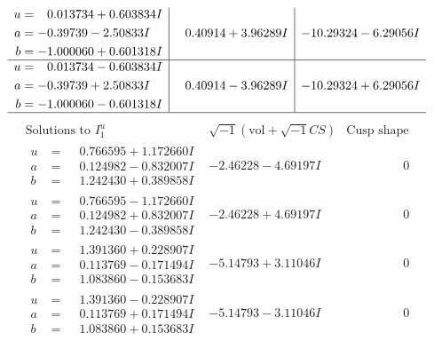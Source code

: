 \documentclass[1p]{elsarticle_modified}
\theoremstyle{definition}
\newcommand{\I}{\sqrt{-1}}
\begin{document}
$$\begin{array}{c|c|c}
\begin{aligned}
u &= \phantom{-}0.013734 + 0.603834 I \\
a &= -0.39739 - 2.50833 I \\
b &= -1.000060 + 0.601318 I\end{aligned}
 & \phantom{-}0.40914 + 3.96289 I & -10.29324 - 6.29056 I \\ \hline\begin{aligned}
u &= \phantom{-}0.013734 - 0.603834 I \\
a &= -0.39739 + 2.50833 I \\
b &= -1.000060 - 0.601318 I\end{aligned}
 & \phantom{-}0.40914 - 3.96289 I & -10.29324 + 6.29056 I\\
 \hline 
 \end{array}$$\newpage$$\begin{array}{c|c|c}  
\text{Solutions to }I^u_{1}& \I (\text{vol} + \sqrt{-1}CS) & \text{Cusp shape}\\
 \hline 
\begin{aligned}
u &= \phantom{-}0.766595 + 1.172660 I \\
a &= \phantom{-}0.124982 - 0.832007 I \\
b &= \phantom{-}1.242430 + 0.389858 I\end{aligned}
 & -2.46228 - 4.69197 I & \phantom{-0.000000 } 0 \\ \hline\begin{aligned}
u &= \phantom{-}0.766595 - 1.172660 I \\
a &= \phantom{-}0.124982 + 0.832007 I \\
b &= \phantom{-}1.242430 - 0.389858 I\end{aligned}
 & -2.46228 + 4.69197 I & \phantom{-0.000000 } 0 \\ \hline\begin{aligned}
u &= \phantom{-}1.391360 + 0.228907 I \\
a &= \phantom{-}0.113769 - 0.171494 I \\
b &= \phantom{-}1.083860 - 0.153683 I\end{aligned}
 & -5.14793 + 3.11046 I & \phantom{-0.000000 } 0 \\ \hline\begin{aligned}
u &= \phantom{-}1.391360 - 0.228907 I \\
a &= \phantom{-}0.113769 + 0.171494 I \\
b &= \phantom{-}1.083860 + 0.153683 I\end{aligned}
 & -5.14793 - 3.11046 I & \phantom{-0.000000 } 0 \\ \hline\begin{aligned}

\end{aligned}
\end{array}$$
\end{document}
